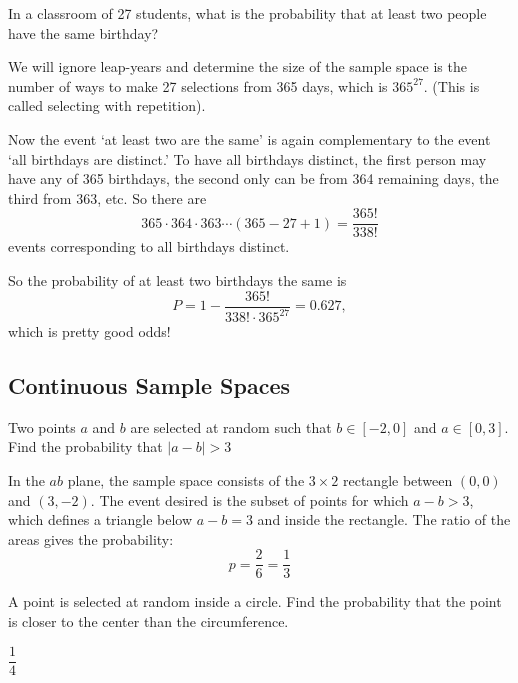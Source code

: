 \documentclass[../main.tex]{subfiles}
\begin{document}
\begin{example}
	In a classroom of 27 students, what is the probability
	that at least two people have the same birthday?
\end{example}

\begin{solution}
	We will ignore leap-years and determine the size of the sample
	space is the number of ways to make 27 selections from 365 days, which is $365^{27}$. (This is called selecting with repetition).
	
	Now the event `at least two are the same' is again complementary to the event `all birthdays are distinct.' To have all birthdays distinct, the first person may have any of 365 birthdays,
	the second only can be from 364 remaining days, the third
	from 363, etc. So there are 
	$$ 365 \cdot 364 \cdot 363 \cdots (365-27+1) = \dfrac{365!}{338!}
	$$ events corresponding to all birthdays distinct.
	
	So the probability of at least two birthdays the same is
	$$ P = 1 - \dfrac{365!}{338! \cdot 365^{27}} = 0.627, $$
	which is pretty good odds!
\end{solution}

\subsection{Continuous Sample Spaces}
\begin{example}
	Two points $a$ and $b$ are selected at random such that
	$b \in [-2,0]$ and $a \in [0,3]$. Find the
	probability that $|a-b| > 3$
\end{example}

\begin{solution}
	In the $ab$ plane, the sample space consists of the
	$3 \times 2$ rectangle between $(0,0)$ and $(3,-2)$.
	The event desired is the subset of points 
	for which $a-b>3$, which defines a triangle below $a-b=3$
	and inside the rectangle. The ratio of the areas gives the
	probability:  
	$$p = \dfrac{2}{6} = \dfrac{1}{3}$$
\end{solution}

\begin{example}
	A point is selected at random inside a circle. Find the probability that the point is closer to the center
	than the circumference.
\end{example}

\begin{solution}[Answer.]
	$\dfrac14$
\end{solution}
\end{document}
